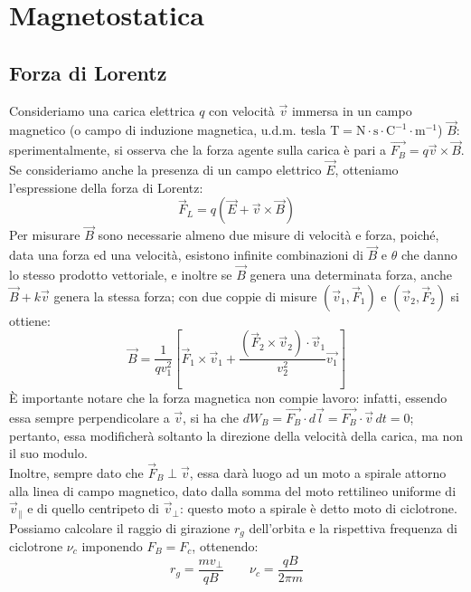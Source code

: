 \section{Magnetostatica}

\subsection{Forza di Lorentz}

Consideriamo una carica elettrica $ q $ con velocità $ \vec{v} $ immersa in un campo magnetico (o campo di induzione magnetica, u.d.m. tesla $ \text{T} = \text{N}\cdot\text{s}\cdot\text{C}^{-1}\cdot\text{m}^{-1} $) $ \vec{B} $: sperimentalmente, si osserva che la forza agente sulla carica è pari a $ \vec{F_B} = q \vec{v}\times\vec{B} $.\\
%
Se consideriamo anche la presenza di un campo elettrico $ \vec{E} $, otteniamo l'espressione della forza di Lorentz:
\begin{equation}
	\vec{F}_L = q ( \vec{E} + \vec{v} \times \vec{B} )
	\label{eq:f-lotentz}
\end{equation}
Per misurare $ \vec{B} $ sono necessarie almeno due misure di velocità e forza, poiché, data una forza ed una velocità, esistono infinite combinazioni di $ \vec{B} $ e $ \theta $ che danno lo stesso prodotto vettoriale, e inoltre se $ \vec{B} $ genera una determinata forza, anche $ \vec{B} + k\vec{v} $ genera la stessa forza; con due coppie di misure $ (\vec{v}_1, \vec{F}_1) $ e $ (\vec{v}_2, \vec{F}_2) $ si ottiene:
\begin{equation}
	\vec{B} = \displaystyle\frac{1}{qv_1^2} \left[ \vec{F}_1 \times \vec{v}_1 + \displaystyle\frac{(\vec{F}_2 \times \vec{v}_2) \cdot \vec{v}_1}{v_2^2} \vec{v_1} \right]
	\label{eq:}
\end{equation}
%
È importante notare che la forza magnetica non compie lavoro: infatti, essendo essa sempre perpendicolare a $ \vec{v} $, si ha che $ dW_B = \vec{F_B} \cdot d\vec{l} = \vec{F_B} \cdot \vec{v} \, dt = 0$; pertanto, essa modificherà soltanto la direzione della velocità della carica, ma non il suo modulo.\\
%
Inoltre, sempre dato che $ \vec{F}_B \perp \vec{v} $, essa darà luogo ad un moto a spirale attorno alla linea di campo magnetico, dato dalla somma del moto rettilineo uniforme di $ \vec{v}_{\parallel} $ e di quello centripeto di $ \vec{v}_{\perp} $: questo moto a spirale è detto moto di ciclotrone. Possiamo calcolare il raggio di girazione $ r_g $ dell'orbita e la rispettiva frequenza di ciclotrone $ \nu_c $ imponendo $ F_B = F_c $, ottenendo:
\begin{equation}
	r_g = \displaystyle\frac{m v_{\perp}}{q B} \qquad \nu_c = \displaystyle\frac{q B}{2\pi m}
	\label{eq:eq-ciclotrone}
\end{equation}

